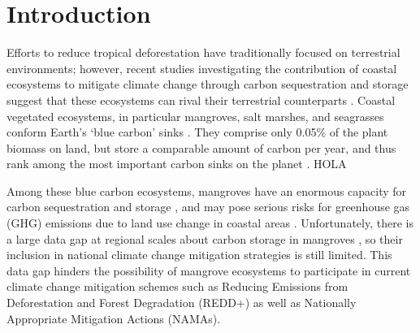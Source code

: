 \documentclass[review, authoryear]{elsarticle}   	%
\begin{document}
%

\linenumbers

\section{Introduction}

Efforts to reduce tropical deforestation have traditionally focused on terrestrial environments; however, recent studies investigating the contribution of coastal ecosystems to mitigate climate change through carbon sequestration and storage suggest that these ecosystems can rival their terrestrial counterparts \citep{Yee2010}. Coastal vegetated ecosystems, in particular mangroves, salt marshes, and seagrasses conform Earth's `blue carbon' sinks \citep{Herr2012}. They comprise only  0.05\% of the plant biomass on land, but store a comparable amount of carbon per year, and thus rank among the most important carbon sinks on the planet \citep{Nellemann2009}. HOLA


Among these blue carbon ecosystems, mangroves have an enormous capacity for carbon sequestration and storage \citep{Nellemann2009, Donato2011, Adame2013}, and may pose serious risks for greenhouse gas (GHG) emissions due to land use change in coastal areas \citep{WorldBank2010}. Unfortunately, there is a large data gap at regional scales about carbon storage in mangroves \citep{Donato2011}, so their inclusion in national climate change mitigation strategies is still limited. This data gap hinders the possibility of mangrove ecosystems to participate in current climate change mitigation schemes such as Reducing Emissions from Deforestation and Forest Degradation (REDD+) as well as Nationally Appropriate Mitigation Actions (NAMAs)\citep{Alongi2011, Herr2012, Murray2012, Boucher2014}. %
\end{document}
